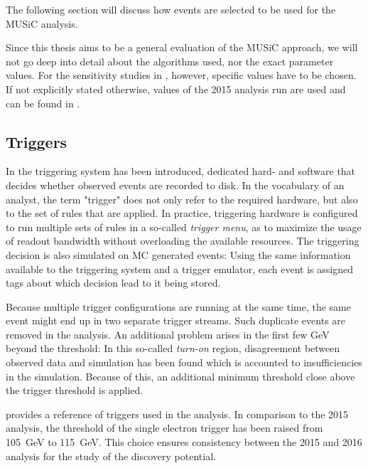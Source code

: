 The following section will discuss how events are selected to be used for the \ac{MUSiC} analysis. 

Since this thesis aims to be a general evaluation of the \ac{MUSiC} approach, we will not go deep into detail about the algorithms used, nor the exact parameter values. For the sensitivity studies in , however, specific values have to be chosen. If not explicitly stated otherwise, values of the 2015 analysis run are used and can be found in \cite{Roemer:ModelUnspecificSearch}.

\subsection{Triggers}
\newcommand{\trigger}[1]{\texttt{\detokenize{#1}}}
In  the triggering system has been introduced, dedicated hard- and software that decides whether observed events are recorded to disk. In the vocabulary of an analyst, the term "trigger" does not only refer to the required hardware, but also to the set of rules that are applied. In practice, triggering hardware is configured to run multiple sets of rules in a so-called \emph{trigger menu}, as to maximize the usage of readout bandwidth without overloading the available resources.
The triggering decision is also simulated on \ac{MC} generated events: Using the same information available to the triggering system and a trigger emulator, each event is assigned tags about which decision lead to it being stored. 

Because multiple trigger configurations are running at the same time, the same event might end up in two separate trigger streams. Such duplicate events are removed in the analysis.
An additional problem arises in the first few \si{\GeV} beyond the \pT threshold: In this so-called \emph{turn-on} region, disagreement between observed data and simulation has been found which is accounted to insufficiencies in the simulation. Because of this, an additional minimum \pT threshold close above the trigger threshold is applied.

 provides a reference of triggers used in the analysis. In comparison to the 2015 analysis, the \pT threshold of the single electron trigger has been raised from \SI{105}{\GeV} to \SI{115}{\GeV}. This choice ensures consistency between the 2015 and 2016 analysis for the study of the discovery potential.


